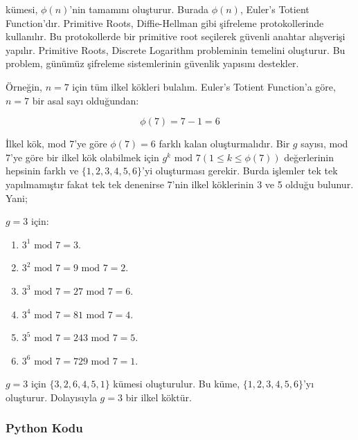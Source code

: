 kümesi, $\phi(n)$'nin tamamını oluşturur. Burada $\phi(n)$, Euler's Totient Function'dır. Primitive Roots, Diffie-Hellman gibi şifreleme protokollerinde kullanılır. Bu protokollerde bir primitive root seçilerek güvenli anahtar alışverişi yapılır. Primitive Roots, Discrete Logarithm probleminin temelini oluşturur. Bu problem, günümüz şifreleme sistemlerinin güvenlik yapısını destekler.

Örneğin, $n = 7$ için tüm ilkel kökleri bulalım. Euler's Totient Function'a göre, $n = 7$ bir asal sayı olduğundan:

\[ \phi(7) = 7 - 1 = 6 \]

İlkel kök, mod 7'ye göre $\phi(7) = 6$ farklı kalan oluşturmalıdır. Bir $g$ sayısı, mod 7'ye göre bir ilkel kök olabilmek için $g^k \text{ mod } 7 (1 \leq k \leq \phi(7))$ değerlerinin hepsinin farklı ve $\{ 1, 2, 3, 4, 5, 6 \}$'yi oluşturması gerekir. Burda işlemler tek tek yapılmamıştır fakat tek tek denenirse 7'nin ilkel köklerinin 3 ve 5 olduğu bulunur. Yani;

$g = 3$ için:

\begin{enumerate}
    \item $3^1 \text{ mod } 7 = 3$.
    \item $3^2 \text{ mod } 7 = 9 \text{ mod } 7 = 2$.
    \item $3^3 \text{ mod } 7 = 27 \text{ mod } 7 = 6$.
    \item $3^4 \text{ mod } 7 = 81 \text{ mod } 7 = 4$.
    \item $3^5 \text{ mod } 7 = 243 \text{ mod } 7 = 5$.
    \item $3^6 \text{ mod } 7 = 729 \text{ mod } 7 = 1$.
\end{enumerate}

$g = 3$ için $\{ 3, 2, 6, 4, 5, 1 \}$ kümesi oluşturulur. Bu küme, $\{ 1, 2, 3, 4, 5, 6 \}$'yı oluşturur. Dolayısıyla $g = 3$ bir ilkel köktür.

\subsubsection{Python Kodu}

